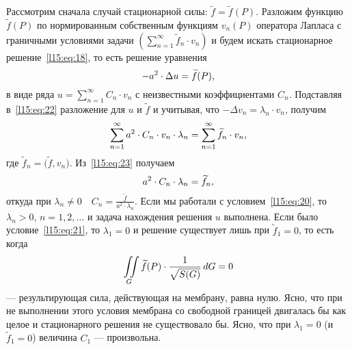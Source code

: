 Рассмотрим сначала случай стационарной силы: $\widetilde{f}=\widetilde{f}(P)$. Разложим функцию $\widetilde{f}(P)$ по нормированным собственным функциям $v_n(P)$ оператора Лапласа с граничными условиями задачи $\left(\sum\limits_{n=1}^{\infty}\widetilde{f}_n\cdot v_n\right)$ и будем искать стационарное решение~\eqref{l15:eq:18}, то есть решение уравнения
\begin{equation}\label{l15:eq:22}
	\hfill-a^2\cdot\Delta u=\widetilde{f}(P),\hfill
\end{equation}
в виде ряда $\displaystyle u=\sum\limits_{n=1}^{\infty}C_n\cdot v_n$ с неизвестными коэффициентами $C_n$. Подставляя в~\eqref{l15:eq:22} разложение для $u$ и $\widetilde{f}$ и учитывая, что $-\Delta v_n=\lambda_n\cdot v_n$, получим
\begin{equation}\label{l15:eq:23}
	\hfill\sum\limits_{n=1}^{\infty}a^2\cdot C_n\cdot v_n\cdot\lambda_n=\sum\limits_{n=1}^{\infty}\widetilde{f}_n\cdot v_n,\hfill
\end{equation}
где $\widetilde{f}_n=\big(\widetilde{f},v_n\big)$. Из~\eqref{l15:eq:23} получаем
\begin{equation*}
	\hfill a^2\cdot C_n\cdot\lambda_n=\widetilde{f}_n,\hfill
\end{equation*}
откуда при $\lambda_n\neq0\quad$$\displaystyle C_n=\frac{\widetilde{f}}{a^2\cdot\lambda_n}$. Если мы работали с условием~\eqref{l15:eq:20}, то $\lambda_n>0$, $n=1,2,\ldots$ и задача нахождения решения $u$ выполнена. Если было условие~\eqref{l15:eq:21}, то $\lambda_1=0$ и решение существует лишь при $\widetilde{f}_1=0$, то есть когда 
\begin{equation*}
	\hfill\iint\limits_{G} \widetilde{f}(P)\cdot\frac{1}{\sqrt{S(G)}}\,dG=0\hfill
\end{equation*}
--- результирующая сила, действующая на мембрану, равна нулю. Ясно, что при не выполнении этого условия мембрана со свободной границей двигалась бы как целое и стационарного решения не существовало бы. Ясно, что при $\lambda_1=0$ (и $\widetilde{f}_1=0$) величина $C_1$ --- произвольна.  

